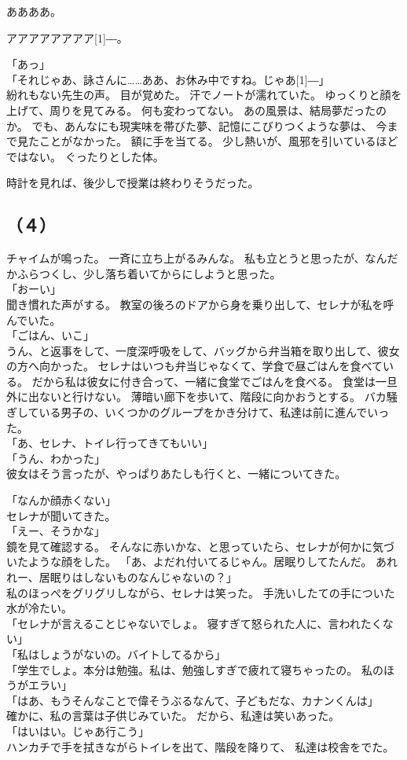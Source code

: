 \documentclass[../IHMain]{subfiles}
\begin{document}
ああああ。

アアアアアアアア\scalebox{3}[1]{―}。

「あっ」\\
「それじゃあ、詠さんに……ああ、お休み中ですね。じゃあ\scalebox{3}[1]{―}」\\
紛れもない先生の声。
目が覚めた。
汗でノートが濡れていた。
ゆっくりと顔を上げて、周りを見てみる。
何も変わってない。
あの風景は、結局夢だったのか。
でも、あんなにも現実味を帯びた夢、記憶にこびりつくような夢は、
今まで見たことがなかった。
額に手を当てる。
少し熱いが、風邪を引いているほどではない。
ぐったりとした体。

時計を見れば、後少しで授業は終わりそうだった。

\subsection*{（４）}
チャイムが鳴った。
一斉に立ち上がるみんな。
私も立とうと思ったが、なんだかふらつくし、少し落ち着いてからにしようと思った。\\
「おーい」\\
聞き慣れた声がする。
教室の後ろのドアから身を乗り出して、セレナが私を呼んでいた。\\
「ごはん、いこ」\\
うん、と返事をして、一度深呼吸をして、バッグから弁当箱を取り出して、彼女の方へ向かった。
セレナはいつも弁当じゃなくて、学食で昼ごはんを食べている。
だから私は彼女に付き合って、一緒に食堂でごはんを食べる。
食堂は一旦外に出ないと行けない。
薄暗い廊下を歩いて、階段に向かおうとする。
バカ騒ぎしている男子の、いくつかのグループをかき分けて、私達は前に進んでいった。\\
「あ、セレナ、トイレ行ってきてもいい」\\
「うん、わかった」\\
彼女はそう言ったが、やっぱりあたしも行くと、一緒についてきた。

「なんか顔赤くない」\\
セレナが聞いてきた。\\
「えー、そうかな」\\
鏡を見て確認する。
そんなに赤いかな、と思っていたら、セレナが何かに気づいたような顔をした。
「あ、よだれ付いてるじゃん。居眠りしてたんだ。
あれれー、居眠りはしないものなんじゃないの？」\\
私のほっぺをグリグリしながら、セレナは笑った。
手洗いしたての手についた水が冷たい。\\
「セレナが言えることじゃないでしょ。
寝すぎて怒られた人に、言われたくない」\\
「私はしょうがないの。バイトしてるから」\\
「学生でしょ。本分は勉強。私は、勉強しすぎで疲れて寝ちゃったの。
私のほうがエラい」\\
「はあ、もうそんなことで偉そうぶるなんて、子どもだな、カナンくんは」\\
確かに、私の言葉は子供じみていた。
だから、私達は笑いあった。\\
「はいはい。じゃあ行こう」\\
ハンカチで手を拭きながらトイレを出て、階段を降りて、
私達は校舎をでた。\\
\end{document}
